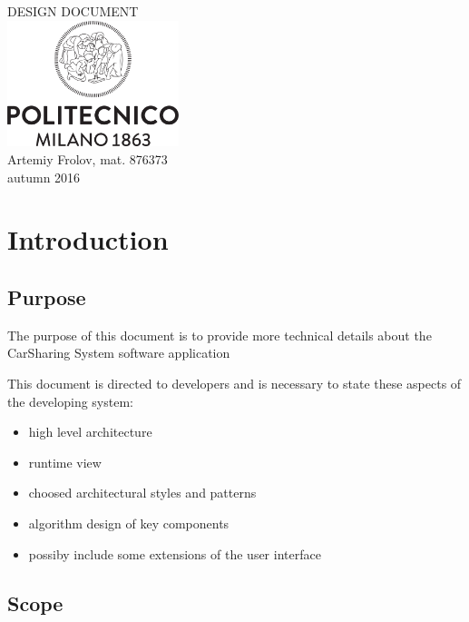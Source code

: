 \documentclass[12pt, letterpaper]{article}
\begin{document}
\begin{titlepage}
\centering
{\Huge DESIGN DOCUMENT} \\
\vspace{1cm}
\includegraphics[width=5cm]{Logo_Politecnico_Milano.png} \\
\vspace{1cm}
Artemiy Frolov, mat. 876373 \\
\vspace{0.5cm}
autumn 2016
\end{titlepage}


\tableofcontents{}

\newpage

\section{Introduction}
\subsection{Purpose}

The purpose of this document is to provide more technical details about the CarSharing System software application 

This document is directed to developers and is necessary to state these aspects of the developing system: 
\begin{itemize}
	\item high level architecture 
	\item runtime view 
	\item choosed architectural styles and patterns
	\item algorithm design of key components 
	\item possiby include some extensions of the user interface 
\end{itemize}

\subsection{Scope}
\end{document}
